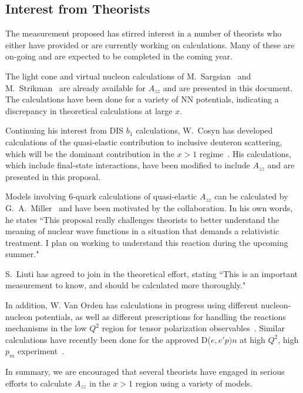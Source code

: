 \subsection{Interest from Theorists}

The measurement proposed has stirred interest in a number of theorists who either have provided or are currently working on calculations. Many of these are on-going and are expected to be completed in the coming year.

The light cone and virtual nucleon calculations of M.~Sargsian~\cite{misak-convo} and M.~Strikman~\cite{strikman-convo} are already available for $A_{zz}$ and are presented in this document. The calculations have been done for a variety of NN potentials, indicating a discrepancy in theoretical calculations at large $x$. 

Continuing his interest from DIS $b_1$ calculations, W.~Cosyn has developed calculations of the quasi-elastic contribution to inclusive deuteron scattering, which will be the dominant contribution in the $x>1$ regime~\cite{cosyn-convo}. His calculations, which include final-state interactions, have been modified to include $A_{zz}$ and are presented in this proposal.

Models involving 6-quark calculations of quasi-elastic $A_{zz}$ can be calculated by G.~A.~Miller~\cite{miller-convo} and have been motivated by the collaboration. In his own words, he states ``This proposal really challenges theorists to better understand the meaning of nuclear wave functions in a situation that demands a relativistic treatment. I plan on working to understand this reaction during the upcoming summer."

S.~Liuti has agreed to join in the theoretical effort, stating ``This is an important measurement to know, and should be calculated more thoroughly."~\cite{liuti-convo}

In addition, W. Van Orden has calculations in progress using different nucleon-nucleon potentials, as well as different prescriptions for handling the reactions mechanisms in the low $Q^2$ region for tensor polarization observables~\cite{vanorden-convo}.  Similar calculations have recently been done for the approved
D($e,e'p)n$ at high $Q^2$, high $p_m$ experiment~\cite{Ford:2014yua}. 

In summary, we are encouraged that several theorists have engaged in serious efforts to calculate $A_{zz}$ in the $x>1$ region using a variety of models.